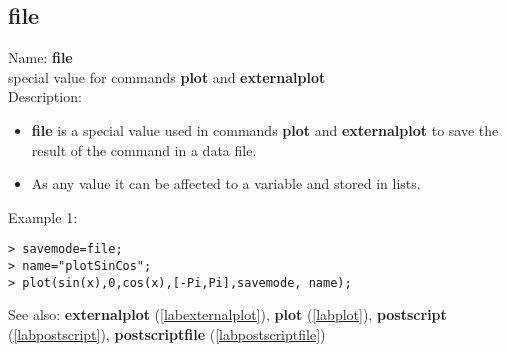 \subsection{file}
\label{labfile}
\noindent Name: \textbf{file}\\
special value for commands \textbf{plot} and \textbf{externalplot}\\

\noindent Description: \begin{itemize}

\item \textbf{file} is a special value used in commands \textbf{plot} and \textbf{externalplot} to save
   the result of the command in a data file.

\item As any value it can be affected to a variable and stored in lists.
\end{itemize}
\noindent Example 1: 
\begin{center}\begin{minipage}{15cm}\begin{Verbatim}[frame=single]
> savemode=file;
> name="plotSinCos";
> plot(sin(x),0,cos(x),[-Pi,Pi],savemode, name);
\end{Verbatim}
\end{minipage}\end{center}
See also: \textbf{externalplot} (\ref{labexternalplot}), \textbf{plot} (\ref{labplot}), \textbf{postscript} (\ref{labpostscript}), \textbf{postscriptfile} (\ref{labpostscriptfile})
